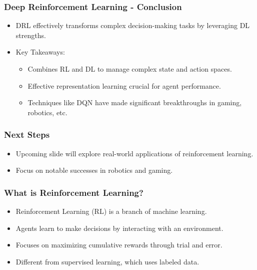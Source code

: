 \documentclass[aspectratio=169]{beamer}
\begin{document}
\begin{frame}[fragile]
    \frametitle{Deep Reinforcement Learning - Conclusion}
    \begin{itemize}
        \item DRL effectively transforms complex decision-making tasks by leveraging DL strengths.
        \item Key Takeaways:
        \begin{itemize}
            \item Combines RL and DL to manage complex state and action spaces.
            \item Effective representation learning crucial for agent performance.
            \item Techniques like DQN have made significant breakthroughs in gaming, robotics, etc.
        \end{itemize}
    \end{itemize}
\end{frame}

\begin{frame}[fragile]
    \frametitle{Next Steps}
    \begin{itemize}
        \item Upcoming slide will explore real-world applications of reinforcement learning.
        \item Focus on notable successes in robotics and gaming.
    \end{itemize}
\end{frame}

\begin{frame}[fragile]
    \frametitle{What is Reinforcement Learning?}
    \begin{itemize}
        \item Reinforcement Learning (RL) is a branch of machine learning.
        \item Agents learn to make decisions by interacting with an environment.
        \item Focuses on maximizing cumulative rewards through trial and error.
        \item Different from supervised learning, which uses labeled data.
    \end{itemize}
\end{frame}
\end{document}
